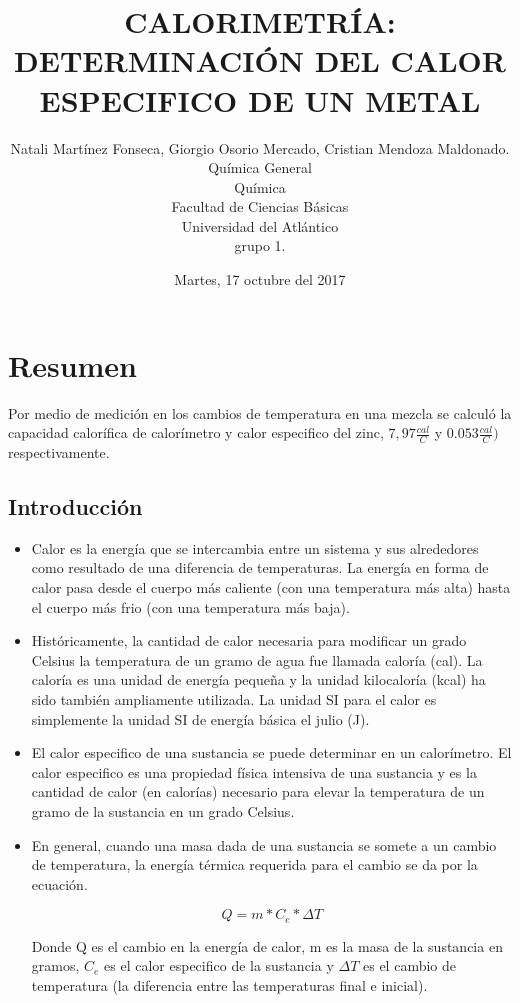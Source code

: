 \documentclass{article}
\title{CALORIMETRÍA: DETERMINACIÓN DEL CALOR ESPECIFICO DE UN METAL}
\author{Natali Martínez Fonseca, Giorgio Osorio Mercado, Cristian Mendoza Maldonado.\\Química General\\Química\\Facultad de Ciencias Básicas\\ Universidad del Atlántico\\grupo 1. }
\date{Martes, 17 octubre del 2017}
\begin{document}
\maketitle 

\section{Resumen}
Por medio de medición en los cambios de temperatura en una mezcla se calculó la capacidad calorífica de calorímetro y calor especifico del zinc, $7,97 \frac{cal}{C}$ y  $0.053\frac{cal}{C}) $ respectivamente.


\begin{multicols}{2}

\section{Introducción}

\begin{itemize}
    \item Calor es la energía que se intercambia entre un sistema y sus alrededores como resultado de una diferencia de temperaturas. La energía en forma de calor pasa desde el cuerpo más caliente (con una temperatura más alta) hasta el cuerpo más frio (con una temperatura más baja).
    \item Históricamente, la cantidad de calor necesaria para modificar un grado Celsius la temperatura de un gramo de agua fue llamada caloría (cal). La caloría es una unidad de energía pequeña y la unidad kilocaloría (kcal) ha sido también ampliamente utilizada. La unidad SI para el calor es simplemente la unidad SI de energía básica el julio (J).
    \item El calor especifico de una sustancia se puede determinar en un calorímetro. El calor especifico es una propiedad física intensiva de una sustancia y es la cantidad de calor (en calorías) necesario para elevar la temperatura de un gramo de la sustancia en un grado Celsius.
    \item En general, cuando una masa dada de una sustancia se somete a un cambio de temperatura, la energía térmica requerida para el cambio se da por la ecuación. 
    
    \begin{equation}
        Q=m*C_{e}* \Delta T
    \end{equation}
    
    Donde Q es el cambio en la energía de calor,  m es la masa  de la sustancia en gramos, $C_{e}$ es el calor especifico de la sustancia y $\Delta T$ es el cambio de temperatura (la diferencia entre las temperaturas final e inicial).
\end{itemize}


\end{multicols}
\end{document}
